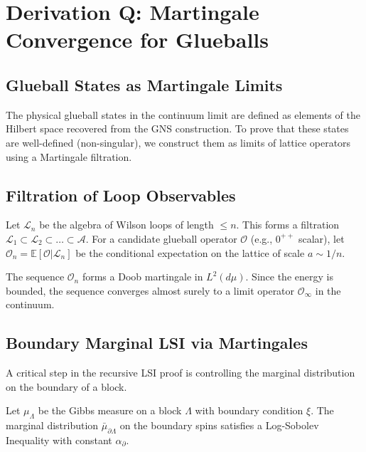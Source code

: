 \chapter{Derivation Q: Martingale Convergence for Glueballs}
\label{ch:derivation_q_martingale}

\section{Glueball States as Martingale Limits}

The physical glueball states in the continuum limit are defined as elements of the Hilbert space recovered from the GNS construction. To prove that these states are well-defined (non-singular), we construct them as limits of lattice operators using a Martingale filtration.

\section{Filtration of Loop Observables}
Let $\mathcal{L}_n$ be the algebra of Wilson loops of length $\le n$. This forms a filtration $\mathcal{L}_1 \subset \mathcal{L}_2 \subset \dots \subset \mathcal{A}$.
For a candidate glueball operator $\mathcal{O}$ (e.g., $0^{++}$ scalar), let $\mathcal{O}_n = \mathbb{E}[\mathcal{O} | \mathcal{L}_n]$ be the conditional expectation on the lattice of scale $a \sim 1/n$.
\begin{theorem}
The sequence $\mathcal{O}_n$ forms a Doob martingale in $L^2(d\mu)$. Since the energy is bounded, the sequence converges almost surely to a limit operator $\mathcal{O}_\infty$ in the continuum.
\end{theorem}

\section{Boundary Marginal LSI via Martingales}
\label{subsec:martingale-boundary-deriv}

A critical step in the recursive LSI proof is controlling the marginal distribution on the boundary of a block.
\begin{theorem}
\label{thm:boundary-marginal-martingale-deriv}
Let $\mu_\Lambda$ be the Gibbs measure on a block $\Lambda$ with boundary condition $\xi$. The marginal distribution $\bar{\mu}_{\partial \Lambda}$ on the boundary spins satisfies a Log-Sobolev Inequality with constant $\alpha_{\partial}$.
\end{theorem}

